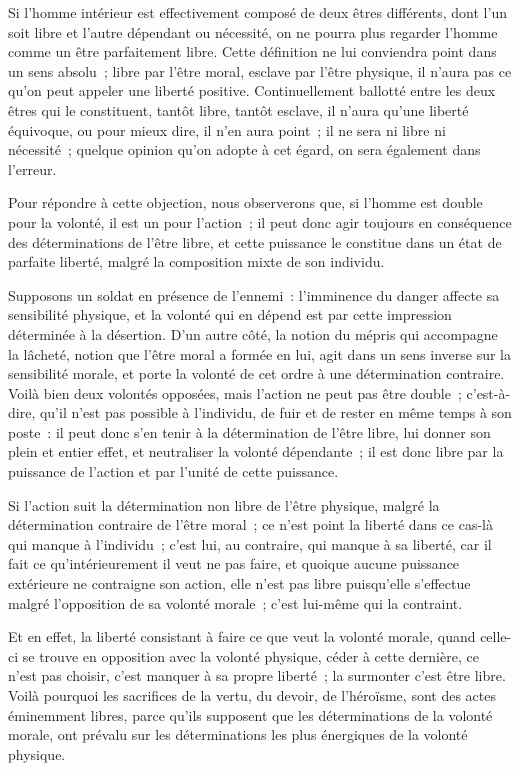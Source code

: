 \documentclass[french,twoside]{book} %
\newcommand\chaptercont{} %
\begin{document}
\chaptercont
\noindent Si l’homme intérieur est effectivement composé de deux êtres différents, dont l’un soit libre et l’autre dépendant ou nécessité, on ne pourra plus regarder l’homme comme un être parfaitement libre. Cette définition ne lui conviendra point dans un sens absolu ; libre par l’être moral, esclave par l’être physique, il n’aura pas ce qu’on peut appeler une liberté positive. Continuellement ballotté entre les deux êtres qui le constituent, tantôt libre, tantôt esclave, il n’aura qu’une liberté équivoque, ou pour mieux dire, il n’en aura point ; il ne sera ni libre ni nécessité ; quelque opinion qu’on adopte à cet égard, on sera également dans l’erreur.\par
Pour répondre à cette objection, nous observerons que, si l’homme est double pour la volonté, il est un pour l’action ; il peut donc agir toujours en conséquence des déterminations de l’être libre, et cette puissance le constitue dans un état de parfaite liberté, malgré la composition mixte de son individu.\par
Supposons un soldat en présence de l’ennemi : l’imminence du danger affecte sa sensibilité physique, et la volonté qui en dépend est par cette impression déterminée à la désertion. D’un autre côté, la notion du mépris qui accompagne la lâcheté, notion que l’être moral a formée en lui, agit dans un sens inverse sur la sensibilité morale, et porte la volonté de cet ordre à une détermination contraire. Voilà bien deux volontés opposées, mais l’action ne peut pas être double ; c’est-à-dire, qu’il n’est pas possible à l’individu, de fuir et de rester en même temps à son poste : il peut donc s’en tenir à la détermination de l’être libre, lui donner son plein et entier effet, et neutraliser la volonté dépendante ; il est donc libre par la puissance de l’action et par l’unité de cette puissance.\par
Si l’action suit la détermination non libre de l’être physique, malgré la détermination contraire de l’être moral ; ce n’est point la liberté dans ce cas-là qui manque à l’individu ; c’est lui, au contraire, qui manque à sa liberté, car il fait ce qu’intérieurement il veut ne pas faire, et quoique aucune puissance extérieure ne contraigne son action, elle n’est pas libre puisqu’elle s’effectue malgré l’opposition de sa volonté morale ; c’est lui-même qui la contraint.\par
Et en effet, la liberté consistant à faire ce que veut la volonté morale, quand celle-ci se trouve en opposition avec la volonté physique, céder à cette dernière, ce n’est pas choisir, c’est manquer à sa propre liberté ; la surmonter c’est être libre. Voilà pourquoi les sacrifices de la vertu, du devoir, de l’héroïsme, sont des actes éminemment libres, parce qu’ils supposent que les déterminations de la volonté morale, ont prévalu sur les déterminations les plus énergiques de la volonté physique.\par
\end{document}
